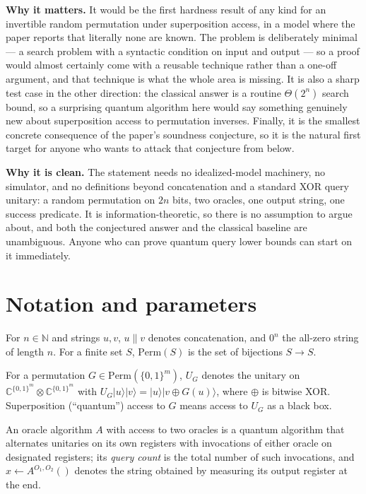 \documentclass{conjura-conjecture}
\newcommand{\ket}[1]{|#1\rangle}
\newcommand{\Perm}{\mathrm{Perm}}
\newcommand{\CC}{\mathbb{C}}
\newcommand{\NN}{\mathbb{N}}
\newcommand{\bits}{\{0,1\}}
\begin{document}
\textbf{Why it matters.} It would be the first hardness result of any
kind for an invertible random permutation under superposition access,
in a model where the paper reports that literally none are known. The
problem is deliberately minimal --- a search problem with a syntactic
condition on input and output --- so a proof would almost certainly
come with a reusable technique rather than a one-off argument, and
that technique is what the whole area is missing. It is also a sharp
test case in the other direction: the classical answer is a routine
$\Theta(2^n)$ search bound, so a surprising quantum algorithm here
would say something genuinely new about superposition access to
permutation inverses. Finally, it is the smallest concrete consequence
of the paper's soundness conjecture, so it is the natural first target
for anyone who wants to attack that conjecture from below.

\textbf{Why it is clean.} The statement needs no idealized-model
machinery, no simulator, and no definitions beyond concatenation and a
standard XOR query unitary: a random permutation on $2n$ bits, two
oracles, one output string, one success predicate. It is
information-theoretic, so there is no assumption to argue about, and
both the conjectured answer and the classical baseline are
unambiguous. Anyone who can prove quantum query lower bounds can start
on it immediately.

\section{Notation and parameters}\label{sec:notation}

For $n \in \NN$ and strings $u, v$, $u \| v$ denotes concatenation,
and $0^n$ the all-zero string of length $n$. For a finite set $S$,
$\Perm(S)$ is the set of bijections $S \to S$.

For a permutation $G \in \Perm(\bits^{m})$, $U_G$ denotes the unitary
on $\CC^{\bits^m} \otimes \CC^{\bits^m}$ with
$U_G \ket{u} \ket{v} = \ket{u} \ket{v \oplus G(u)}$, where $\oplus$ is
bitwise XOR. Superposition (``quantum'') access to $G$ means access to
$U_G$ as a black box.

An oracle algorithm $A$ with access to two oracles is a quantum
algorithm that alternates unitaries on its own registers with
invocations of either oracle on designated registers; its \emph{query
count} is the total number of such invocations, and
$x \leftarrow A^{O_1,O_2}()$ denotes the string obtained by measuring
its output register at the end.
\end{document}
